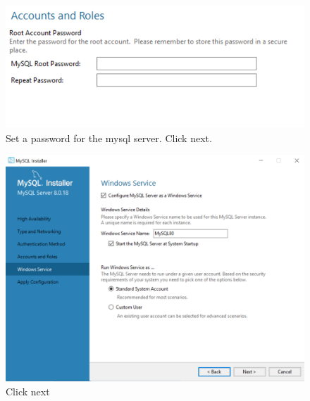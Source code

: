 \begin{figure}[h]
\centering
\includegraphics[width=\textwidth]{Images/4-mysql.png}
\caption{\label{fig:fmy} Set a password for the mysql server. Click next.}
\end{figure}
\begin{figure}[h]
\centering
\includegraphics[width=\textwidth]{Images/6-mysql.png}
\caption{\label{fig:fmy} Click next}
\end{figure}
